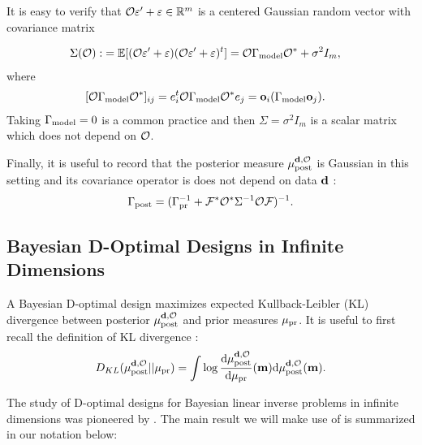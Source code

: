 It is easy to verify that $\mathcal{O} \varepsilon' + \varepsilon \in \mathbb{R}^m$ is a centered
Gaussian random vector with covariance matrix

\begin{align}\label{eq:Sigma}
  \begin{split}
    \Sigma(\mathcal{O}) :&= \mathbb{E}[ (\mathcal{O} \varepsilon' + \varepsilon) (\mathcal{O} \varepsilon' +
      \varepsilon)^t ]
    = \mathcal{O} \Gamma_{\textup{model}} \mathcal{O}^* + \sigma^2I_m , 
  \end{split}
\end{align}
where
\begin{align}\label{eq:modcov explained}
  \begin{split}
    [\obs \modcov \obs^*]_{ij} & = e_i^t \obs \modcov \obs^* e_j 
    = \meas_i (\modcov \meas_j).%
  \end{split}
\end{align}
Taking $\Gamma_{\textup{model}} = 0$ is a common practice
\cite{tarantola2005,Kaipio2005,Vogel02} and then $\Sigma =
\sigma^2I_m$ is a scalar matrix which does not depend on $\mathcal{O}$.

Finally, it is useful to record that the posterior measure $\mu_{\textup{post}}^{\mathbf{d}, \mathcal{O}}$ is
Gaussian in this setting and its covariance operator is does not
depend on data $\mathbf{d}$ \cite{Stuart10}:
\begin{align}\label{eq:postcov}
  \Gamma_{\textup{post}} = (\Gamma_{\textup{pr}}^{-1} + \mathcal{F}^* \mathcal{O}^* \Sigma^{-1} \mathcal{O} \mathcal{F}
  )^{-1}.
\end{align}

\subsection{Bayesian D-Optimal Designs in Infinite Dimensions}\label{subsec:D optimal design} 
A Bayesian D-optimal design maximizes expected Kullback-Leibler (KL)
divergence between posterior $\mu_{\textup{post}}^{\mathbf{d}, \mathcal{O}}$ and prior measures $\mu_{\textup{pr}}$. It is
useful to first recall the definition of KL divergence \cite{CoverThomas91}:
$$
D_{KL}(\mu_{\textup{post}}^{\mathbf{d}, \mathcal{O}}||\mu_{\textup{pr}}) = \int \log \frac{\text{\textup{d}} \mu_{\textup{post}}^{\mathbf{d}, \mathcal{O}}}{\text{\textup{d}} \mu_{\textup{pr}}}(\mathbf{m}) \text{\textup{d}} \mu_{\textup{post}}^{\mathbf{d}, \mathcal{O}}(\mathbf{m}).
$$

The study of D-optimal designs for Bayesian linear inverse problems in
infinite dimensions was pioneered by \cite{AlexanderianGloorGhattas14,
  alexanderian2018efficient}. The main result we will make use of is
summarized in our notation below:


